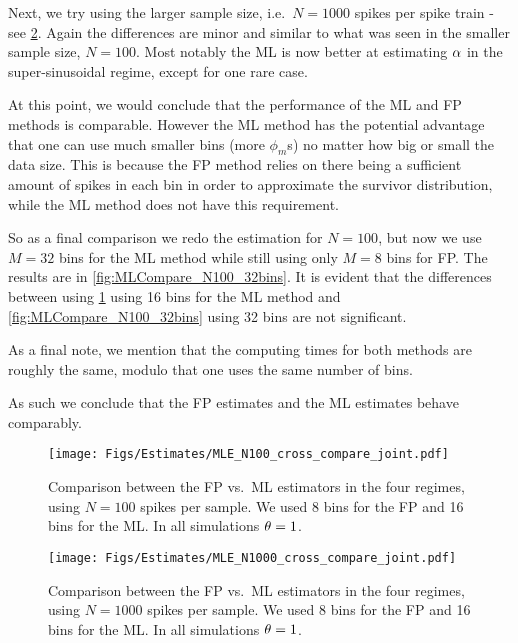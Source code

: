 \documentclass{article}
\begin{document}
Next, we try using the larger sample size, i.e.\ $N=1000$ spikes per spike train
- see \cref{fig:MLCompare_N1000}. Again the differences are minor and similar to
what was seen in the smaller sample size, $N=100$. Most notably the ML is now
better at estimating ${\alpha}$ in the super-sinusoidal regime, except for one rare
case.


At this point, we would conclude that the performance of the ML and FP
methods is comparable. However the ML method has the potential advantage that
one can use much smaller bins (more $\phi_m$s) no matter how big or small the
data size. This is because the FP method relies on there being a sufficient
amount of spikes in each bin in order to approximate the survivor distribution,
while the ML method does not have this requirement.

So as a final comparison we redo the estimation for $N=100$, but now
we use $M=32$ bins for the ML method while still using only $M=8$ bins for
FP. The results are in \cref{fig:MLCompare_N100_32bins}. It is evident
that the differences between using \cref{fig:MLCompare_N100} using 16 bins for
the ML method and \cref{fig:MLCompare_N100_32bins} using 32 bins are not
significant.

As a final note, we mention that the computing times for both methods are
roughly the same, modulo that one uses the same number of bins.

As such we conclude that the FP estimates and the ML estimates behave comparably.
 
\begin{figure}[htp]
\begin{center}
  \texttt{[image: Figs/Estimates/MLE\_N100\_cross\_compare\_joint.pdf]}
  \caption{Comparison between the FP vs.\ ML
  estimators in the four regimes, using $N=100$ spikes per sample. We used 8
  bins for the FP and 16 bins for the ML. In all simulations ${\theta} = 1$.}
  \label{fig:MLCompare_N100}
\end{center}
\end{figure}

\begin{figure}[htp]
\begin{center}
  \texttt{[image: Figs/Estimates/MLE\_N1000\_cross\_compare\_joint.pdf]}
  \caption[labelInTOC]{Comparison between the FP vs.\ ML
  estimators in the four regimes, using $N=1000$ spikes per sample. We used 8
  bins for the FP and 16 bins for the ML. In all simulations ${\theta} = 1$.}
  \label{fig:MLCompare_N1000}
\end{center}
\end{figure}
% 
\end{document}
